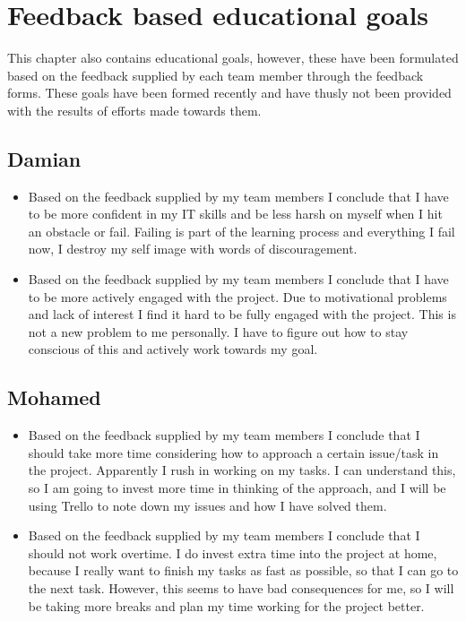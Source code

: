 \documentclass[12pt]{article}
\begin{document}
	\section{Feedback based educational goals}
	This chapter also contains educational goals, however, these have been formulated based on the feedback supplied by each team member through the feedback forms. These goals have been formed recently and have thusly not been provided with the results of efforts made towards them.
	\subsection{Damian}
	\begin{itemize}
		\item Based on the feedback supplied by my team members I conclude that I have to be more confident in my IT skills and be less harsh on myself when I hit an obstacle or fail. Failing is part of the learning process and everything I fail now, I destroy my self image with words of discouragement.
		\item Based on the feedback supplied by my team members I conclude that I have to be more actively engaged with the project. Due to motivational problems and lack of interest I find it hard to be fully engaged with the project. This is not a new problem to me personally. I have to figure out how to stay conscious of this and actively work towards my goal.
	\end{itemize}
	\subsection{Mohamed}
	\begin{itemize}
		\item Based on the feedback supplied by my team members I conclude that I should take more time considering how to approach a certain issue/task in the project. Apparently I rush in working on my tasks. I can understand this, so I am going to invest more time in thinking of the approach, and I will be using Trello to note down my issues and how I have solved them.
		\item Based on the feedback supplied by my team members I conclude that I should not work overtime. I do invest extra time into the project at home, because I really want to finish my tasks as fast as possible, so that I can go to the next task. However, this seems to have bad consequences for me, so I will be taking more breaks and plan my time working for the project better.		
	\end{itemize}
\end{document}
